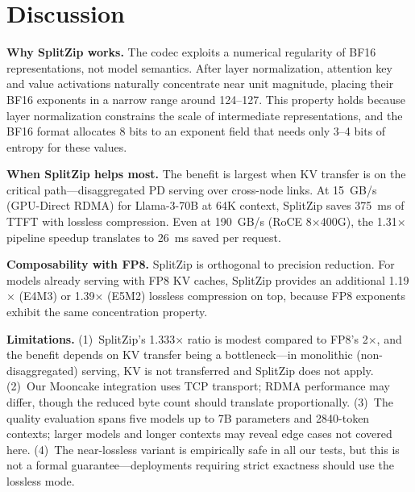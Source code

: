 \section{Discussion}
\label{sec:discussion}

\textbf{Why SplitZip works.} The codec exploits a numerical regularity of BF16 representations, not model semantics. After layer normalization, attention key and value activations naturally concentrate near unit magnitude, placing their BF16 exponents in a narrow range around 124--127. This property holds because layer normalization constrains the scale of intermediate representations, and the BF16 format allocates 8 bits to an exponent field that needs only 3--4 bits of entropy for these values.

\textbf{When SplitZip helps most.} The benefit is largest when KV transfer is on the critical path---disaggregated PD serving over cross-node links. At 15~GB/s (GPU-Direct RDMA) for Llama-3-70B at 64K context, SplitZip saves 375~ms of TTFT with lossless compression. Even at 190~GB/s (RoCE 8$\times$400G), the 1.31$\times$ pipeline speedup translates to 26~ms saved per request.

\textbf{Composability with FP8.} SplitZip is orthogonal to precision reduction. For models already serving with FP8 KV caches, SplitZip provides an additional 1.19$\times$ (E4M3) or 1.39$\times$ (E5M2) lossless compression on top, because FP8 exponents exhibit the same concentration property.

\textbf{Limitations.} (1)~SplitZip's 1.333$\times$ ratio is modest compared to FP8's 2$\times$, and the benefit depends on KV transfer being a bottleneck---in monolithic (non-disaggregated) serving, KV is not transferred and SplitZip does not apply. (2)~Our Mooncake integration uses TCP transport; RDMA performance may differ, though the reduced byte count should translate proportionally. (3)~The quality evaluation spans five models up to 7B parameters and 2840-token contexts; larger models and longer contexts may reveal edge cases not covered here. (4)~The near-lossless variant is empirically safe in all our tests, but this is not a formal guarantee---deployments requiring strict exactness should use the lossless mode.
